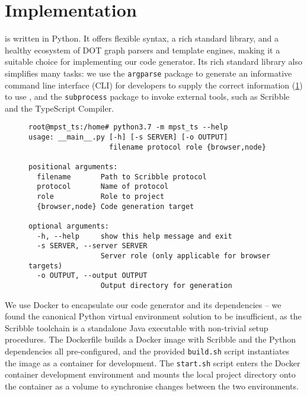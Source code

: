 \section{Implementation}

 is written in Python. 
It offers flexible syntax, a rich standard library, and 
a healthy ecosystem of DOT graph parsers and template engines,
making it a suitable choice for implementing our code generator.
Its rich standard library also simplifies many tasks: we use
the \texttt{argparse} package to generate an informative
command line interface (CLI) for developers to 
supply the correct information (\cref{lst:cmdline})
to use ,
and the \texttt{subprocess} package to 
invoke external tools, such as Scribble and the TypeScript Compiler.

\begin{figure}[!ht]
\begin{lstlisting}
root@mpst_ts:/home# python3.7 -m mpst_ts --help
usage: __main__.py [-h] [-s SERVER] [-o OUTPUT]
                   filename protocol role {browser,node}

positional arguments:
  filename       Path to Scribble protocol
  protocol       Name of protocol
  role           Role to project
  {browser,node} Code generation target

optional arguments:
  -h, --help     show this help message and exit
  -s SERVER, --server SERVER
                 Server role (only applicable for browser targets)
  -o OUTPUT, --output OUTPUT
                 Output directory for generation
\end{lstlisting}
\label{lst:cmdline}
\end{figure}

We use Docker \cite{docker} to encapsulate our code generator
and its dependencies -- we found the canonical Python virtual environment
solution to be insufficient, as the Scribble toolchain is
a standalone Java executable with non-trivial setup procedures.
The Dockerfile builds a Docker image with Scribble and
the Python dependencies all pre-configured, and the provided
\texttt{build.sh} script instantiates the image as a container 
for development.
The \texttt{start.sh} script enters the Docker container
development environment and mounts the local project directory
onto the container as a volume to synchronise changes between the
two environments.